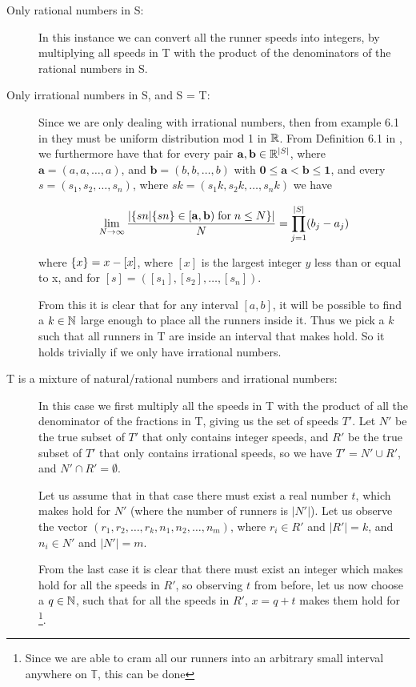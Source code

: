 \begin{description}
\item[Only rational numbers in S:] In this instance we can convert all the runner speeds into integers, by multiplying all speeds in T with the product of the denominators of the rational numbers in S.
\item[Only irrational numbers in S, and S = T:]
Since we are only dealing with irrational numbers, then from example 6.1 in \cite{uniform} they must be uniform distribution mod 1 in $\mathbb{R}$. 
From Definition 6.1 in \cite{uniform}, we furthermore have that for every pair $\mathbf{a}, \mathbf{b} \in \mathbb{R}^{|S|}$, where $\mathbf{a} = (a, a, \ldots, a)$, and $\mathbf{b} = (b, b, \ldots, b)$ with $\mathbf{0} \leq \mathbf{a} < \mathbf{b} \leq \mathbf{1}$, and every $s = (s_1, s_2, \ldots, s_n)$, where $sk = (s_1k, s_2k, \ldots, s_nk)$ we have

$$
\lim_{N \rightarrow \infty} \frac{
|\{
sn | \{sn\} \in [\mathbf{a}, \mathbf{b}) \;\mathrm{for}\;n \leq N
\}|
}{
N
} = 
\prod^{|S|}_{j=1}(b_j - a_j) 
$$

where $\{x\} = x - [x]$, where $[x]$ is the largest integer $y$ less than or equal to x, and for $[s] = ([s_1], [s_2], \ldots, [s_n])$.

From this it is clear that for any interval $[a, b]$, it will be possible to find a $k \in \mathbb{N}$ large enough to place all the runners inside it. Thus we pick a $k$ such that all runners in T are inside an interval that makes  hold. So it holds trivially if we only have irrational numbers.

\item[T is a mixture of natural/rational numbers and irrational numbers:]
In this case we first multiply all the speeds in T with the product of all the denominator of the fractions in T, giving us the set of speeds $T\prime$. Let $N\prime$ be the true subset of $T\prime$ that only contains integer speeds, and $R\prime$ be the true subset of $T\prime$ that only contains irrational speeds, so we have $T\prime = N\prime \cup R\prime$, and $N\prime \cap R\prime = \emptyset$.

Let us assume that in that case there must exist a real number $t$, which makes  hold for $N\prime$ (where the number of runners is $|N\prime|$). Let us observe the vector $(r_1, r_2, \ldots, r_k, n_1, n_2, \ldots, n_m)$, where $r_i \in R\prime$ and $|R\prime| = k$, and $n_i \in N\prime$ and $|N\prime| = m$. 

From the last case it is clear that there must exist an integer which makes  hold for all the speeds in $R\prime$, so observing $t$ from before, let us now choose a $q \in \mathbb{N}$, such that for all the speeds in $R\prime$, $x = q + t$ makes them hold for \footnote{Since we are able to cram all our runners into an arbitrary small interval anywhere on $\mathbb{T}$, this can be done}.


\end{description}
